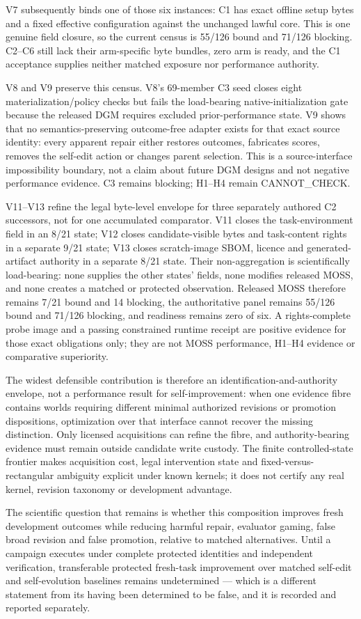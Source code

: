 V7 subsequently binds one of those six instances: C1 has exact offline setup
bytes and a fixed effective configuration against the unchanged lawful core.
This is one genuine field closure, so the current census is 55/126 bound and
71/126 blocking. C2--C6 still lack their arm-specific byte bundles, zero arm is
ready, and the C1 acceptance supplies neither matched exposure nor performance
authority.

V8 and V9 preserve this census. V8's 69-member C3 seed closes eight
materialization/policy checks but fails the load-bearing native-initialization
gate because the released DGM requires excluded prior-performance state. V9
shows that no semantics-preserving outcome-free adapter exists for that exact
source identity: every apparent repair either restores outcomes, fabricates
scores, removes the self-edit action or changes parent selection. This is a
source-interface impossibility boundary, not a claim about future DGM designs
and not negative performance evidence. C3 remains blocking; H1--H4 remain
\textsf{CANNOT\_CHECK}.

V11--V13 refine the legal byte-level envelope for three separately authored C2
successors, not for one accumulated comparator. V11 closes the task-environment
field in an 8/21 state; V12 closes candidate-visible bytes and task-content
rights in a separate 9/21 state; V13 closes scratch-image SBOM, licence and
generated-artifact authority in a separate 8/21 state. Their non-aggregation is
scientifically load-bearing: none supplies the other states' fields, none
modifies released MOSS, and none creates a matched or protected observation.
Released MOSS therefore remains 7/21 bound and 14 blocking, the authoritative
panel remains 55/126 bound and 71/126 blocking, and readiness remains zero of
six. A rights-complete probe image and a passing constrained runtime receipt are
positive evidence for those exact obligations only; they are not MOSS
performance, H1--H4 evidence or comparative superiority.

The widest defensible contribution is therefore an identification-and-authority
envelope, not a performance result for self-improvement: when one evidence
fibre contains worlds requiring different minimal authorized revisions or
promotion dispositions, optimization over that interface cannot recover the
missing distinction. Only licensed acquisitions can refine the fibre, and
authority-bearing evidence must remain outside candidate write custody. The
finite controlled-state frontier makes acquisition cost, legal intervention
state and fixed-versus-rectangular ambiguity explicit under known kernels; it
does not certify any real kernel, revision taxonomy or development advantage.

The scientific question that remains is whether this composition improves fresh development outcomes while reducing harmful repair, evaluator gaming, false broad revision and false promotion, relative to matched alternatives. Until a campaign executes under complete protected identities and independent verification, transferable protected fresh-task improvement over matched self-edit and self-evolution baselines remains undetermined --- which is a different statement from its having been determined to be false, and it is recorded and reported separately.
